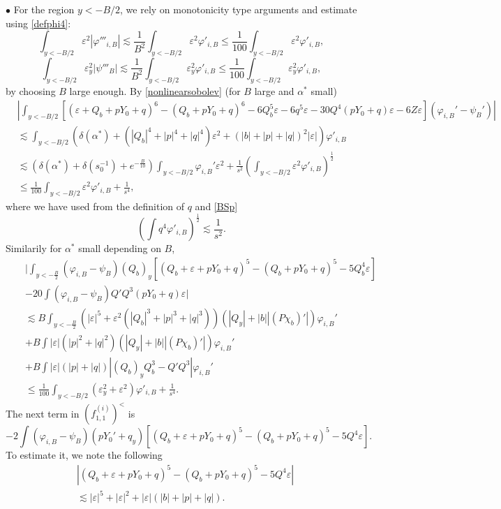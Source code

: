 \documentclass[11pt,a4paper,reqno]{amsart}
\theoremstyle{remark}
\numberwithin{equation}{section}
\newcommand{\bee}{\begin{eqnarray*}}
\newcommand{\eee}{\end{eqnarray*}}
\def\e{\varepsilon}
\def\Yz{Y_0}
\begin{document}
$\bullet$ For the region $y<-B/2$, we rely on monotonicity type arguments and estimate using \eqref{defphi4}:
$$
\int_{y<-B/2} \varepsilon^2 |\varphi'''_{i,B}|\lesssim
  \frac 1 {B^2}  \int_{y<-B/2} \varepsilon^2 \varphi'_{i,B} \leq  \frac 1{100} \int_{y<-B/2} \varepsilon^2 \varphi'_{i,B},
$$
$$\int_{y<-B/2} \varepsilon_y^2|\psi'''_B|\lesssim
  \frac 1 {B^2}  \int_{y<-B/2} \varepsilon_y^2 \varphi'_{i,B} \leq  \frac 1{100} \int_{y<-B/2} \varepsilon_y^2 \varphi'_{i,B},$$
by choosing $B$ large enough.  
By \eqref{nonlinearsobolev} (for $B$ large and $\alpha^*$ small)
\begin{align*}
& \left| \int_{y<-B/2}  \left[ (\varepsilon {+} Q_b {+}p\Yz{+}q )^6{-}  {(Q_b{+}p\Yz{+}q) ^6}  {-}6 Q_b ^5 \varepsilon {-} 6 q^5 \e{-}30 Q^4(p\Yz{+}q)\e{-} 6Z \varepsilon \right](\varphi_{i,B}'{-}\psi_B') \right|
\\ 
& \lesssim    
 \int_{y<-B/2} \left(\delta(\alpha^*)  + (|Q_b| ^4+|p|^4+|q|^4) \varepsilon^2
 +(|b|+|p|+|q|)^2 |\e| \right)\varphi'_{i,B} 
 \\& \lesssim  \left(\delta(\alpha^*)+\delta(s_0^{-1})+e^{-\frac B{10} }\right)\int_{y<-B/2}  \varphi_{i,B}' \e^2 
 +\frac 1{s^2} \left( \int_{y<-B/2}  \varepsilon^2   \varphi'_{i,B}\right)^{\frac 12}
 \\
& \leq    \frac 1{100} \int_{y<-B/2}  \varepsilon^2   \varphi'_{i,B}+\frac 1{s^4},
\end{align*}
where we have used from the definition of $q$ and \eqref{BSp}
$$
\left(\int q^4  \varphi'_{i,B}\right)^{\frac 12} \lesssim \frac 1{s^2}.
$$
Similarily for $\alpha^*$ small depending on $B$,
\bee
&& \bigg| \int_{y<-\frac{B}{2}}  (\varphi_{i,B}-\psi_B)(Q_b)_y\left[(Q_b+\e+p\Yz+q)^5-(Q_b +p\Yz+q)^5-5Q_b^4\e\right] \\ &&-   20 \int (\varphi_{i,B}-\psi_B) Q' Q^3 (p\Yz+q) \e 
\bigg|\\
&& \lesssim   B \int_{y<-\frac B2}\left(|\e|^5+\e^2(|Q_b|^3+|p|^3+|q|^3)\right)(|Q_y|+|b||(P\chi_b)'|)\varphi_{i,B}' \\
&&+B \int |\e|\left(  |p|^2+|q|^2\right)
(|Q_y|+|b||(P\chi_b)'| )\varphi_{i,B}'\\
&&+B \int |\e|  (|p|+|q|)   
\left| (Q_b)_y Q_b^3 - Q'Q^3\right|\varphi_{i,B}'\\&&\leq \frac 1{100} \int_{y<-B/2}  (\e_y^2+\varepsilon^2)  \varphi'_{i,B}+\frac 1{s^4}.
\eee
The next term in $(f^{(i)}_{1,1})^<$ is
$$- 2\int (\varphi_{i,B}-\psi_B)(p \Yz'+q_y) [(Q_b+\e+p\Yz+q)^5-(Q_b +p\Yz+q)^5-5Q^4\e].$$
To estimate it, we note the following
\begin{align*}
&\left|(Q_b+\e+p\Yz+q)^5-(Q_b +p\Yz+q)^5-5Q^4\e \right|\\
& \lesssim   |\e|^5 +|\e|^2+|\e| (|b|+|p|+|q|).
\end{align*}
\end{document}
